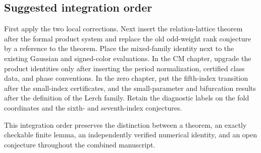 \subsection{Suggested integration order}

First apply the two local corrections. Next insert the relation-lattice
theorem after the formal product system and replace the old odd-weight
rank conjecture by a reference to the theorem. Place the mixed-family
identity next to the existing Gaussian and signed-color evaluations.
In the CM chapter, upgrade the product identities only after inserting
the period normalization, certified class data, and phase conventions.
In the zero chapter, put the fifth-index transition after the small-index
certificates, and the small-parameter and bifurcation results after the
definition of the Lerch family. Retain the diagnostic labels on the
fold coordinates and the sixth- and seventh-index conjectures.

This integration order preserves the distinction between a theorem,
an exactly checkable finite lemma, an independently verified numerical
identity, and an open conjecture throughout the combined manuscript.
